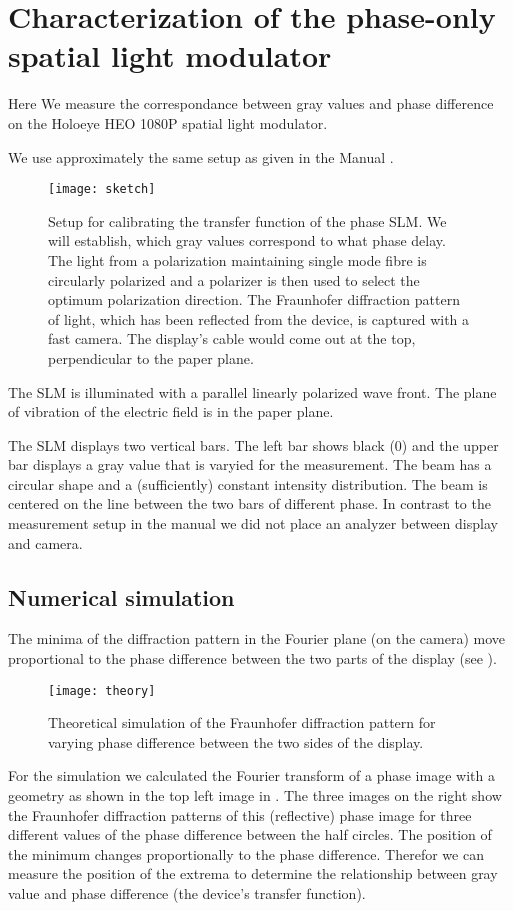\section{ Characterization of the phase-only spatial light modulator}
\begin{summary}
  Here We measure the correspondance between gray values and phase
  difference on the Holoeye HEO 1080P spatial light modulator. 
\end{summary}
We use approximately the same setup as given in the Manual
\citep{Holoeye2006}.
\begin{figure}[!hbt]
  \centering
  \texttt{[image: sketch]}
  \caption{Setup for calibrating the transfer function of the phase
    SLM. We will establish, which gray values correspond to what phase
    delay. The light from a polarization maintaining single mode fibre
    is circularly polarized and a polarizer is then used to select the
    optimum polarization direction. The Fraunhofer diffraction pattern
    of light, which has been reflected from the device, is captured
    with a fast camera. The display's cable would come out at the top,
    perpendicular to the paper plane.}
  \label{fig:holo-calib}
\end{figure}
The SLM is illuminated with a parallel linearly polarized wave
front. The plane of vibration of the electric field is in the paper
plane.

The SLM displays two vertical bars. The left bar shows black (0) and
the upper bar displays a gray value that is varyied for the
measurement.  The beam has a circular shape and a (sufficiently)
constant intensity distribution. The beam is centered on the line
between the two bars of different phase.  In contrast to the
measurement setup in the manual we did not place an analyzer between
display and camera.
\subsection{Numerical simulation}
The minima of the diffraction pattern in the Fourier plane (on the
camera) move proportional to the phase difference between the two
parts of the display (see ).
\begin{figure}[!hbt]
  \centering
  \texttt{[image: theory]}
  \caption{Theoretical simulation of the Fraunhofer diffraction
    pattern for varying phase difference between the two sides of the
    display.}
  \label{fig:holo-theory}
\end{figure}
For the simulation we calculated the Fourier transform of a phase
image with a geometry as shown in the top left image in
.  The three images on the right show the
Fraunhofer diffraction patterns of this (reflective) phase image for
three different values of the phase difference between the half
circles. The position of the minimum changes proportionally to the
phase difference. Therefor we can measure the position of the extrema
to determine the relationship between gray value and phase difference
(the device's transfer function).

